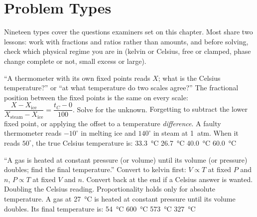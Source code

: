 \section{Problem Types}\label{sec:types-thermal}

Nineteen types cover the questions examiners set on this chapter. Most share two lessons: work with
fractions and ratios rather than amounts, and before solving, check which physical regime you are in
(kelvin or Celsius, free or clamped, phase change complete or not, small excess or large).

{``A thermometer with its own fixed points reads $X$; what is the Celsius temperature?'' or ``at what
temperature do two scales agree?''}
{The fractional position between the fixed points is the same on every scale:
$\dfrac{X-X_{\text{ice}}}{X_{\text{steam}}-X_{\text{ice}}}=\dfrac{t_C-0}{100}$. Solve for the unknown.}
{Forgetting to subtract the lower fixed point, or applying the offset to a temperature
\emph{difference}.}
{A faulty thermometer reads $-10^\circ$ in melting ice and $140^\circ$ in steam at \SI{1}{atm}. When it
reads $50^\circ$, the true Celsius temperature is:}
{\SI{33.3}{\celsius}}
{\SI{26.7}{\celsius}}
{\SI{40.0}{\celsius}}
{\SI{60.0}{\celsius}}

{``A gas is heated at constant pressure (or volume) until its volume (or pressure) doubles; find the
final temperature.''}
{Convert to kelvin first: $V\propto T$ at fixed $P$ and $n$, $P\propto T$ at fixed $V$ and $n$. Convert
back at the end if a Celsius answer is wanted.}
{Doubling the Celsius reading. Proportionality holds only for absolute temperature.}
{A gas at \SI{27}{\celsius} is heated at constant pressure until its volume doubles. Its final
temperature is:}
{\SI{54}{\celsius}}
{\SI{600}{\celsius}}
{\SI{573}{\celsius}}
{\SI{327}{\celsius}}

